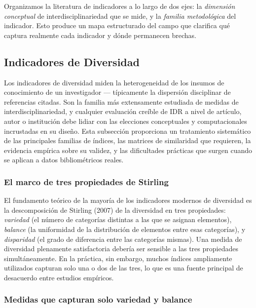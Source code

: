\documentclass[
]{article}
\begin{document}
Organizamos la literatura de indicadores a lo largo de dos ejes: la
\emph{dimensión conceptual} de interdisciplinariedad que se mide, y la
\emph{familia metodológica} del indicador. Esto produce un mapa
estructurado del campo que clarifica qué captura realmente cada
indicador y dónde permanecen brechas.

\hypertarget{indicadores-de-diversidad}{%
\subsection{Indicadores de Diversidad}\label{indicadores-de-diversidad}}

Los indicadores de diversidad miden la heterogeneidad de los insumos de
conocimiento de un investigador --- típicamente la dispersión
disciplinar de referencias citadas. Son la familia más extensamente
estudiada de medidas de interdisciplinariedad, y cualquier evaluación
creíble de IDR a nivel de artículo, autor o institución debe lidiar con
las elecciones conceptuales y computacionales incrustadas en su diseño.
Esta subsección proporciona un tratamiento sistemático de las
principales familias de índices, las matrices de similaridad que
requieren, la evidencia empírica sobre su validez, y las dificultades
prácticas que surgen cuando se aplican a datos bibliométricos reales.

\hypertarget{el-marco-de-tres-propiedades-de-stirling}{%
\subsubsection{El marco de tres propiedades de
Stirling}\label{el-marco-de-tres-propiedades-de-stirling}}

El fundamento teórico de la mayoría de los indicadores modernos de
diversidad es la descomposición de Stirling (2007) de la diversidad en
tres propiedades: \emph{variedad} (el número de categorías distintas a
las que se asignan elementos), \emph{balance} (la uniformidad de la
distribución de elementos entre esas categorías), y \emph{disparidad}
(el grado de diferencia entre las categorías mismas). Una medida de
diversidad plenamente satisfactoria debería ser sensible a las tres
propiedades simultáneamente. En la práctica, sin embargo, muchos índices
ampliamente utilizados capturan solo una o dos de las tres, lo que es
una fuente principal de desacuerdo entre estudios empíricos.

\hypertarget{medidas-que-capturan-solo-variedad-y-balance}{%
\subsubsection{Medidas que capturan solo variedad y
balance}\label{medidas-que-capturan-solo-variedad-y-balance}}
\end{document}
